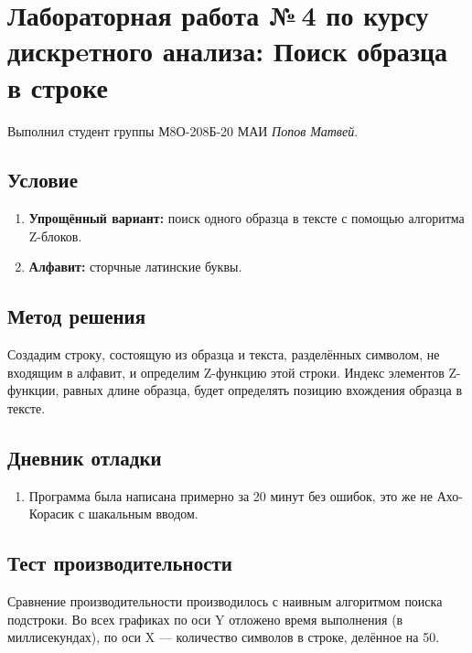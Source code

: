 \documentclass[12pt]{article}
\begin{document}
    
    \section*{Лабораторная работа №\,4 по курсу дискрeтного анализа: Поиск 
    образца в строке}

    Выполнил студент группы М8О-208Б-20 МАИ \textit{Попов Матвей}.

    \subsection*{Условие}

    \begin{enumerate}
        \item \textbf{Упрощённый вариант:} поиск одного образца в тексте с 
        помощью алгоритма Z-блоков.
        \item \textbf{Алфавит:} сторчные латинские буквы.
    \end{enumerate}

    \subsection*{Метод решения}
    Создадим строку, состоящую из образца и текста, разделённых символом, не 
    входящим в алфавит, и определим Z-функцию этой строки. Индекс элементов 
    Z-функции, равных длине образца, будет определять позицию вхождения 
    образца в тексте. 

    \subsection*{Дневник отладки}
    \begin{enumerate}
        \item Программа была написана примерно за 20 минут без ошибок, это же 
        не Ахо-Корасик с шакальным вводом.
    \end{enumerate}

    \subsection*{Тест производительности}
    Сравнение производительности производилось с наивным алгоритмом поиска 
    подстроки. Во всех графиках по оси Y отложено время выполнения 
    (в миллисекундах), по оси X — количество символов в строке, 
    делённое на 50.

\end{document}
